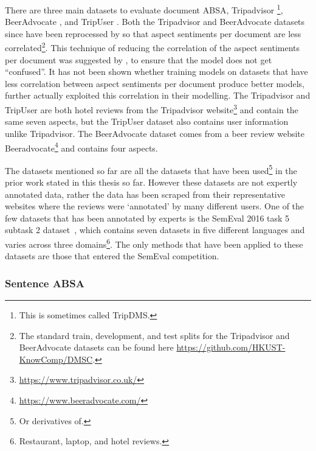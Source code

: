 There are three main datasets to evaluate document ABSA, Tripadvisor \citep{Wang2010LatentAR}\footnote{This is sometimes called TripDMS.}, BeerAdvocate \citep{mcauley2012learning}, and TripUser \citep{li-etal-2018-document}. Both the Tripadvisor and BeerAdvocate datasets since have been reprocessed by \citet{yin-etal-2017-document} so that aspect sentiments per document are less correlated\footnote{The standard train, development, and test splits for the Tripadvisor and BeerAdvocate datasets can be found here \url{https://github.com/HKUST-KnowComp/DMSC}.}. This technique of reducing the correlation of the aspect sentiments per document was suggested by \citet{lei-etal-2016-rationalizing}, to ensure that the model does not get ``confused''. It has not been shown whether training models on datasets that have less correlation between aspect sentiments per document produce better models, further \citet{snyder-barzilay-2007-multiple} actually exploited this correlation in their modelling. The Tripadvisor and TripUser are both hotel reviews from the Tripadvisor website\footnote{\url{https://www.tripadvisor.co.uk/}} and contain the same seven aspects, but the TripUser dataset also contains user information unlike Tripadvisor. The BeerAdvocate dataset comes from a beer review website Beeradvocate\footnote{\url{https://www.beeradvocate.com/}} and contains four aspects.

The datasets mentioned so far are all the datasets that have been used\footnote{Or derivatives of.} in the prior work stated in this thesis so far. However these datasets are not expertly annotated data, rather the data has been scraped from their representative websites where the reviews were `annotated' by many different users. One of the few datasets that has been annotated by experts is the SemEval 2016 task 5 subtask 2 dataset~\citep{pontiki-etal-2016-semeval}, which contains seven datasets in five different languages and varies across three domains\footnote{Restaurant, laptop, and hotel reviews.}. The only methods that have been applied to these datasets are those that entered the SemEval competition.

\subsubsection{Sentence ABSA}
\label{lit_review_sentence_ABSA}

